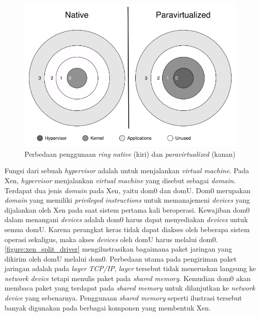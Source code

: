 \begin{figure}[htbp]
    \includegraphics[scale=0.5]{./resources/xen-ring.png}
    \caption[Perbedaan penggunaan \textit{ring} \textit{native} dan \textit{paravirtualized}]{Perbedaan penggunaan \textit{ring} \textit{native} (kiri) dan \textit{paravirtualized} (kanan) \citep{Chisnall2014}}
    \label{figure:xen_ring}
\end{figure}

Fungsi dari sebuah \textit{hypervisor} adalah untuk menjalankan \textit{virtual machine}.
Pada Xen, \textit{hypervisor} menjalankan \textit{virtual machine} yang disebut sebagai \textit{domain}.
Terdapat dua jenis \textit{domain} pada Xen, yaitu dom0 dan domU.
Dom0 merupakan \textit{domain} yang memiliki \textit{privileged instructions} untuk memanajemeni \textit{devices} yang dijalankan oleh Xen pada saat sistem pertama kali beroperasi.
Kewajiban dom0 dalam menangani \textit{devices} adalah dom0 harus dapat menyediakan \textit{devices} untuk semua domU.
Karena perangkat keras tidak dapat diakses oleh beberapa sistem operasi sekaligus, maka akses \textit{devices} oleh domU harus melalui dom0.
\autoref{figure:xen_split_driver} mengilustrasikan bagaimana paket jaringan yang dikirim oleh domU melalui dom0.
Perbedaan utama pada pengiriman paket jaringan adalah pada \textit{layer} \textit{TCP/IP}, \textit{layer} tersebut tidak meneruskan langsung ke \textit{network device} tetapi menulis paket pada \textit{shared memory}.
Kemudian dom0 akan membaca paket yang terdapat pada \textit{shared memory} untuk dilanjutkan ke \textit{network device} yang sebenarnya.
Penggunaan \textit{shared memory} seperti ilustrasi tersebut banyak digunakan pada berbagai komponen yang membentuk Xen.

